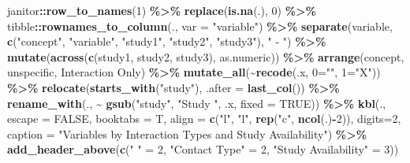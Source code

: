 \documentclass[
]{article}
\newenvironment{Shaded}{\begin{snugshade}}{\end{snugshade}}
\newcommand{\AttributeTok}[1]{\textcolor[rgb]{0.13,0.29,0.53}{#1}}
\newcommand{\ConstantTok}[1]{\textcolor[rgb]{0.56,0.35,0.01}{#1}}
\newcommand{\DecValTok}[1]{\textcolor[rgb]{0.00,0.00,0.81}{#1}}
\newcommand{\FunctionTok}[1]{\textcolor[rgb]{0.13,0.29,0.53}{\textbf{#1}}}
\newcommand{\NormalTok}[1]{#1}
\newcommand{\OtherTok}[1]{\textcolor[rgb]{0.56,0.35,0.01}{#1}}
\newcommand{\SpecialCharTok}[1]{\textcolor[rgb]{0.81,0.36,0.00}{\textbf{#1}}}
\newcommand{\StringTok}[1]{\textcolor[rgb]{0.31,0.60,0.02}{#1}}
\begin{document}
\begin{Shaded}
\begin{Highlighting}[]
\NormalTok{  janitor}\SpecialCharTok{::}\FunctionTok{row\_to\_names}\NormalTok{(}\DecValTok{1}\NormalTok{) }\SpecialCharTok{\%\textgreater{}\%}
  \FunctionTok{replace}\NormalTok{(}\FunctionTok{is.na}\NormalTok{(.), }\DecValTok{0}\NormalTok{) }\SpecialCharTok{\%\textgreater{}\%}
\NormalTok{  tibble}\SpecialCharTok{::}\FunctionTok{rownames\_to\_column}\NormalTok{(., }\AttributeTok{var =} \StringTok{"variable"}\NormalTok{) }\SpecialCharTok{\%\textgreater{}\%}
  \FunctionTok{separate}\NormalTok{(variable, }\FunctionTok{c}\NormalTok{(}\StringTok{"concept"}\NormalTok{, }\StringTok{"variable"}\NormalTok{, }\StringTok{"study1"}\NormalTok{, }\StringTok{"study2"}\NormalTok{, }\StringTok{"study3"}\NormalTok{), }\StringTok{" {-} "}\NormalTok{) }\SpecialCharTok{\%\textgreater{}\%}
  \FunctionTok{mutate}\NormalTok{(}\FunctionTok{across}\NormalTok{(}\FunctionTok{c}\NormalTok{(study1, study2, study3), as.numeric)) }\SpecialCharTok{\%\textgreater{}\%}
  \FunctionTok{arrange}\NormalTok{(concept, unspecific, }\StringTok{\textasciigrave{}}\AttributeTok{Interaction Only}\StringTok{\textasciigrave{}}\NormalTok{) }\SpecialCharTok{\%\textgreater{}\%} 
  \FunctionTok{mutate\_all}\NormalTok{(}\SpecialCharTok{\textasciitilde{}}\FunctionTok{recode}\NormalTok{(.x, }\StringTok{\textasciigrave{}}\AttributeTok{0}\StringTok{\textasciigrave{}}\OtherTok{=}\StringTok{""}\NormalTok{, }\StringTok{\textasciigrave{}}\AttributeTok{ 1}\StringTok{\textasciigrave{}}\OtherTok{=}\StringTok{"X"}\NormalTok{)) }\SpecialCharTok{\%\textgreater{}\%}
  \FunctionTok{relocate}\NormalTok{(}\FunctionTok{starts\_with}\NormalTok{(}\StringTok{"study"}\NormalTok{), }\AttributeTok{.after =} \FunctionTok{last\_col}\NormalTok{()) }\SpecialCharTok{\%\textgreater{}\%}
  \FunctionTok{rename\_with}\NormalTok{(., }\SpecialCharTok{\textasciitilde{}} \FunctionTok{gsub}\NormalTok{(}\StringTok{"study"}\NormalTok{, }\StringTok{"Study "}\NormalTok{, .x, }\AttributeTok{fixed =} \ConstantTok{TRUE}\NormalTok{)) }\SpecialCharTok{\%\textgreater{}\%}
  \FunctionTok{kbl}\NormalTok{(.,}
      \AttributeTok{escape =} \ConstantTok{FALSE}\NormalTok{,}
      \AttributeTok{booktabs =}\NormalTok{ T,}
      \AttributeTok{align =} \FunctionTok{c}\NormalTok{(}\StringTok{"l"}\NormalTok{, }\StringTok{"l"}\NormalTok{, }\FunctionTok{rep}\NormalTok{(}\StringTok{"c"}\NormalTok{, }\FunctionTok{ncol}\NormalTok{(.)}\SpecialCharTok{{-}}\DecValTok{2}\NormalTok{)),}
      \AttributeTok{digits=}\DecValTok{2}\NormalTok{,}
      \AttributeTok{caption =} \StringTok{"Variables by Interaction Types and Study Availability"}\NormalTok{) }\SpecialCharTok{\%\textgreater{}\%}
  \FunctionTok{add\_header\_above}\NormalTok{(}\FunctionTok{c}\NormalTok{(}\StringTok{" "} \OtherTok{=} \DecValTok{2}\NormalTok{, }\StringTok{"Contact Type"} \OtherTok{=} \DecValTok{2}\NormalTok{, }\StringTok{"Study Availability"} \OtherTok{=} \DecValTok{3}\NormalTok{))}
\end{Highlighting}
\end{Shaded}
\end{document}
